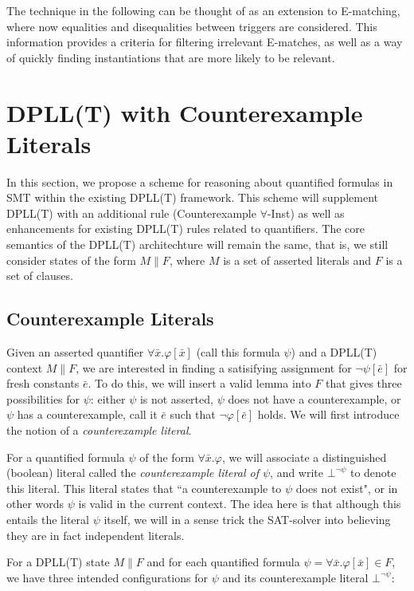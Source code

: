\documentclass{llncs}
\begin{document}
The technique in the following can be thought of as an extension to E-matching, where now equalities and disequalities between triggers are considered.
This information provides a criteria for filtering irrelevant E-matches, as well as a way of quickly finding instantiations that are more likely to be relevant.

\section{DPLL(T) with Counterexample Literals}
\label{dpll-ce-lit}

In this section, we propose a scheme for reasoning about quantified formulas in SMT within the existing DPLL(T) framework.
This scheme will supplement DPLL(T) with an additional rule (Counterexample $\forall$-Inst) as well as enhancements for existing DPLL(T) rules related to quantifiers.
The core semantics of the DPLL(T) architechture will remain the same, that is, we still consider states of the form $M \parallel F$, where $M$ is a set of asserted literals and $F$ is a set of clauses.

\subsection{Counterexample Literals}

Given an asserted quantifier $\forall \bar{x}. \varphi[\bar{x}]$ (call this formula $\psi$) and a DPLL(T) context $M \parallel F$, we are interested in finding a satisifying assignment for $ \neg \psi[\bar{e}]$ for fresh constants $\bar{e}$.
To do this, we will insert a valid lemma into $F$ that gives three possibilities for $\psi$: either $\psi$ is not asserted, $\psi$ does not have a counterexample, or $\psi$ has a counterexample, call it $\bar{e}$ such that $\neg \varphi[\bar{e}]$ holds.
We will first introduce the notion of a \emph{counterexample literal}.

For a quantified formula $\psi$ of the form $\forall \bar{ x }. \varphi$, we will associate a distinguished (boolean) literal called the \emph{counterexample literal of $\psi$}, and write $\bot^{\neg \psi}$ to denote this literal.
This literal states that ``a counterexample to $\psi$ does not exist", or in other words $\psi$ is valid in the current context.
The idea here is that although this entails the literal $\psi$ itself, we will in a sense trick the SAT-solver into believing they are in fact independent literals.

For a DPLL(T) state $M \parallel F$ and for each quantified formula $\psi = \forall \bar{ x }. \varphi[ \bar{ x } ] \in F$, we have three intended configurations for $\psi$ and its counterexample literal $\bot^{\neg \psi}$: \\
\end{document}
